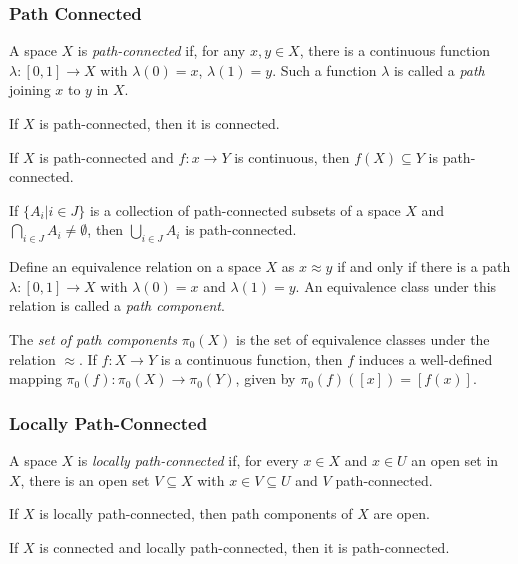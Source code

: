 \subsubsection{Path Connected}\label{pathconnected}
A space $X$ is \emph{path-connected} if, for any $x,y \in X$, there is a continuous function $\lambda: [0,1] \rightarrow X$ with $\lambda(0) = x$, $\lambda(1) = y$.
Such a function $\lambda$ is called a \emph{path}\label{path} joining $x$ to $y$ in $X$.

\begin{proposition}
If $X$ is path-connected, then it is connected.
\end{proposition}

\begin{theorem}
If $X$ is path-connected and $f : x \rightarrow Y$ is continuous, then $f(X) \subseteq Y$ is path-connected.
\end{theorem}

\begin{lemma}
If $\{ A_i | i \in J \}$ is a collection of path-connected subsets of a space $X$ and $\bigcap_{i \in J}A_i \neq \emptyset$, then
$\bigcup_{i \in J}A_i$ is path-connected.
\end{lemma}

\label{pathcomponent}
Define an equivalence relation on a space $X$ as $x \approx y$ if and only if there is a path $\lambda:[0,1] \rightarrow X$ with $\lambda(0) = x$ and $\lambda(1) = y$.
An equivalence class under this relation is called a \emph{path component}.\newline

\noindent The \emph{set of path components}\label{setofpathcomponents} $\pi_0 (X)$ is the set of equivalence classes under the relation $\approx$. If $f : X \rightarrow Y$ is a continuous function,
then $f$ induces a well-defined mapping $\pi_0(f) : \pi_0(X) \rightarrow \pi_0(Y)$, given by $\pi_0(f)([x]) = [f(x)]$.

\subsubsection{Locally Path-Connected}\label{locallypathconnected}
A space $X$ is \emph{locally path-connected} if, for every $x \in X$ and $x \in U$ an open set in $X$, there is an open set $V \subseteq X$ with $x \in V \subseteq U$
and $V$ path-connected.

\begin{proposition}
If $X$ is locally path-connected, then path components of $X$ are open.
\end{proposition}

\begin{corollary}
If $X$ is connected and locally path-connected, then it is path-connected.
\end{corollary}